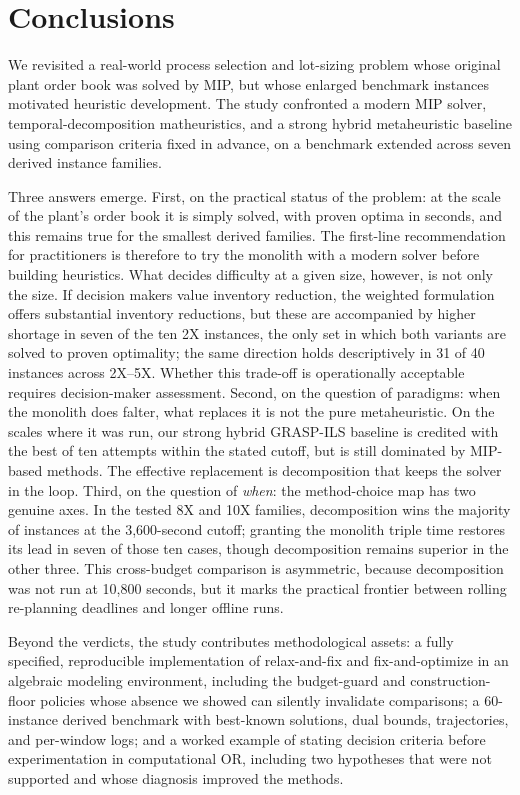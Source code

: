\section{Conclusions}
\label{sec:conclusions}

We revisited a real-world process selection and lot-sizing problem
whose original plant order book was solved by MIP, but whose enlarged
benchmark instances motivated heuristic development. The study
confronted a modern MIP solver, temporal-decomposition matheuristics,
and a strong hybrid metaheuristic baseline using comparison criteria
fixed in advance, on a benchmark extended across seven derived instance
families.

Three answers emerge. First, on the practical status of the
problem: at the scale of the plant's order book it is simply solved,
with proven optima in seconds, and this remains true for the smallest
derived families. The first-line recommendation for practitioners is
therefore to try the monolith with a modern solver before building
heuristics. What decides difficulty at a given size, however, is not
only the size. If decision makers value inventory reduction, the
weighted formulation offers substantial inventory reductions, but these
are accompanied by higher shortage in seven of the ten 2X instances,
the only set in which both variants are solved to proven optimality;
the same direction holds descriptively in 31 of 40 instances across
2X--5X. Whether this trade-off is operationally acceptable requires
decision-maker assessment. Second, on the question of paradigms: when
the monolith does falter, what replaces it is not the pure
metaheuristic. On the scales where it was run, our strong hybrid
GRASP-ILS baseline is credited with the best of ten attempts within the
stated cutoff, but is still dominated by MIP-based methods. The
effective replacement is decomposition that keeps the solver in the
loop.
Third, on the question of \emph{when}: the method-choice map has
two genuine axes. In the tested 8X and 10X families, decomposition
wins the majority of instances at the 3,600-second cutoff; granting the
monolith triple time restores its lead in seven of those ten cases,
though decomposition remains superior in the other three. This
cross-budget comparison is asymmetric, because decomposition was not
run at 10,800 seconds, but it marks the practical frontier between
rolling re-planning deadlines and longer offline runs.

Beyond the verdicts, the study contributes methodological assets:
a fully specified, reproducible implementation of relax-and-fix and
fix-and-optimize in an algebraic modeling environment, including
the budget-guard and construction-floor policies whose absence we
showed can silently invalidate comparisons; a 60-instance derived
benchmark with best-known solutions, dual bounds, trajectories, and
per-window logs; and a worked example of stating decision criteria
before experimentation in computational OR, including two hypotheses
that were not supported and whose diagnosis improved the methods.

